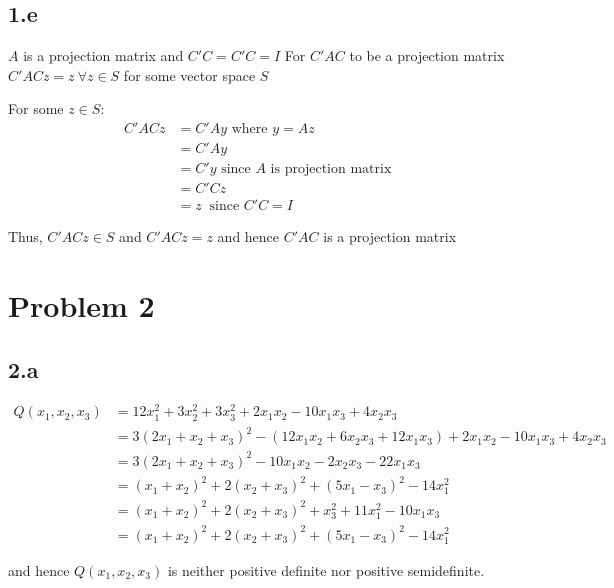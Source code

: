 \documentclass[a4paper]{article}
\begin{document}
\subsection*{1.e}
$A$ is a projection matrix and $C'C=C'C=I$
For $C'AC$ to be a projection matrix $C'ACz=z\ \forall z \in S$ for some vector space $S$

For some $z \in S$:
\begin{align*}
C'ACz &= C'Ay \text{ where } y=Az\\
&= C'Ay\\
&= C'y\text{ since $A$ is projection matrix }  \\
&= C'Cz\\
&= z\ \text{ since } C'C=I
\end{align*}

Thus, $C'ACz \in S$ and $C'ACz=z$ and hence $C'AC$ is a projection matrix

\section*{Problem 2}
\subsection*{2.a}

\begin{align*}
Q(x_1,x_2,x_3) &= 12x_1^2+3x_2^2+3x_3^2+2x_1x_2-10x_1x_3+4x_2x_3\\
&= 3(2x_1+x_2+x_3)^2-(12x_1x_2+6x_2x_3+12x_1x_3)+2x_1x_2-10x_1x_3+4x_2x_3\\
&= 3(2x_1+x_2+x_3)^2-10x_1x_2-2x_2x_3-22x_1x_3\\
&= (x_1+x_2)^2+ 2(x_2+x_3)^2+(5x_1-x_3)^2-14x_1^2\\
&=(x_1+x_2)^2+2(x_2+x_3)^2+x_3^2+11x_1^2-10x_1x_3\\
&= (x_1+x_2)^2+2(x_2+x_3)^2+(5x_1-x_3)^2-14x_1^2
\end{align*}

and hence $Q(x_1,x_2,x_3)$ is neither positive definite nor positive semidefinite.
\end{document}
